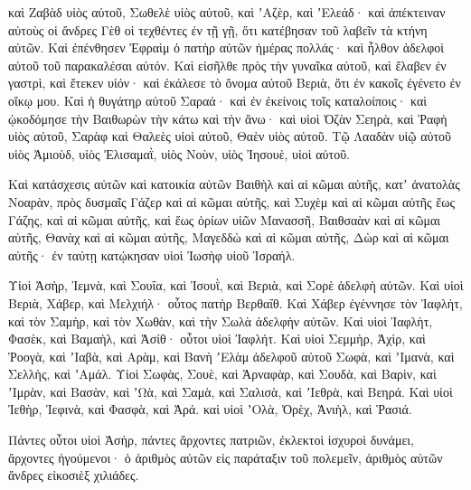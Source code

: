 {καὶ Ζαβὰδ υἱὸς αὐτοῦ, Σωθελὲ υἱὸς αὐτοῦ, καὶ ʼΑζὲρ, καὶ ʼΕλεάδ· καὶ ἀπέκτειναν αὐτοὺς οἱ ἄνδρες Γὲθ οἱ τεχθέντες ἐν τῇ γῇ, ὅτι κατέβησαν τοῦ λαβεῖν τὰ κτήνη αὐτῶν.
Καὶ ἐπένθησεν Ἐφραὶμ ὁ πατὴρ αὐτῶν ἡμέρας πολλάς· καὶ ἦλθον ἀδελφοὶ αὐτοῦ τοῦ παρακαλέσαι αὐτόν.
Καὶ εἰσῆλθε πρὸς τὴν γυναῖκα αὐτοῦ, καὶ ἔλαβεν ἐν γαστρὶ, καὶ ἔτεκεν υἱόν· καὶ ἐκάλεσε τὸ ὄνομα αὐτοῦ Βεριὰ, ὅτι ἐν κακοῖς ἐγένετο ἐν οἴκῳ μου.
Καὶ ἡ θυγάτηρ αὐτοῦ Σαραά· καὶ ἐν ἐκείνοις τοῖς καταλοίποις· καὶ ᾠκοδόμησε τὴν Βαιθωρὼν τὴν κάτω καὶ τὴν ἄνω· καὶ υἱοὶ Ὀζὰν Σεηρὰ,
καὶ Ῥαφὴ υἱὸς αὐτοῦ, Σαρὰφ καὶ Θαλεὲς υἱοὶ αὐτοῦ, Θαὲν υἱὸς αὐτοῦ.
Τῷ Λααδὰν υἱῷ αὐτοῦ υἱὸς Ἀμιοὺδ, υἱὸς Ἐλισαμαῒ,
υἱὸς Νοὺν, υἱὸς Ἰησουὲ, υἱοὶ αὐτοῦ.
\par }{\PP {}Καὶ κατάσχεσις αὐτῶν καὶ κατοικία αὐτῶν Βαιθὴλ καὶ αἱ κῶμαι αὐτῆς, κατʼ ἀνατολὰς Νοαρὰν, πρὸς δυσμαῖς Γάζερ καὶ αἱ κῶμαι αὐτῆς, καὶ Συχὲμ καὶ αἱ κῶμαι αὐτῆς ἕως Γάζης, καὶ αἱ κῶμαι αὐτῆς,
καὶ ἕως ὁρίων υἱῶν Μανασσῆ, Βαιθσαὰν καὶ αἱ κῶμαι αὐτῆς, Θανὰχ καὶ αἱ κῶμαι αὐτῆς, Μαγεδδὼ καὶ αἱ κῶμαι αὐτῆς, Δὼρ καὶ αἱ κῶμαι αὐτῆς· ἐν ταύτῃ κατῴκησαν υἱοὶ Ἰωσὴφ υἱοῦ Ἰσραήλ.
\par }{\PP {}Υἱοὶ Ἀσὴρ, Ἰεμνὰ, καὶ Σουΐα, καὶ Ἰσουῒ, καὶ Βεριὰ, καὶ Σορὲ ἀδελφὴ αὐτῶν.
Καὶ υἱοὶ Βεριὰ, Χάβερ, καὶ Μελχιήλ· οὗτος πατὴρ Βερθαΐθ.
Καὶ Χάβερ ἐγέννησε τὸν Ἰαφλὴτ, καὶ τὸν Σαμὴρ, καὶ τὸν Χωθὰν, καὶ τὴν Σωλὰ ἀδελφὴν αὐτῶν.
Καὶ υἱοὶ Ἰαφλὴτ, Φασὲκ, καὶ Βαμαὴλ, καὶ Ἀσίθ· οὗτοι υἱοὶ Ἰαφλήτ.
Καὶ υἱοὶ Σεμμὴρ, Ἀχὶρ, καὶ Ῥοογὰ, καὶ ʼΙαβὰ, καὶ Αρὰμ,
καὶ Βανὴ ʼΕλὰμ ἀδελφοῦ αὐτοῦ Σωφὰ, καὶ ʼΙμανὰ, καὶ Σελλὴς, καὶ ʼΑμάλ.
Υἱοὶ Σωφὰς, Σουὲ, καὶ Ἁρναφὰρ, καὶ Σουδὰ, καὶ Βαρὶν, καὶ ʼΙμρὰν,
καὶ Βασὰν, καὶ ʼΩὰ, καὶ Σαμὰ, καὶ Σαλισὰ, καὶ ʼΙεθρὰ, καὶ Βεηρά.
Καὶ υἱοὶ Ἰεθὴρ, Ἰεφινὰ, καὶ Φασφὰ, καὶ Ἀρά.
καὶ υἱοὶ ʼΟλὰ, Ὀρὲχ, Ἀνιὴλ, καὶ Ῥασιά.
\par }{\PP {}Πάντες οὗτοι υἱοὶ Ἀσὴρ, πάντες ἄρχοντες πατριῶν, ἐκλεκτοὶ ἰσχυροὶ δυνάμει, ἄρχοντες ἡγούμενοι· ὁ ἀριθμὸς αὐτῶν εἰς παράταξιν τοῦ πολεμεῖν, ἀριθμὸς αὐτῶν ἄνδρες εἰκοσιὲξ χιλιάδες.

}
